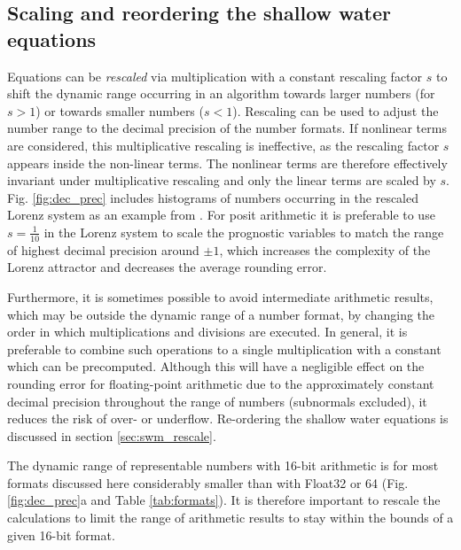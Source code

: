 \subsection{Scaling and reordering the shallow water equations}

Equations can be \emph{rescaled} via multiplication with a constant rescaling
factor $s$ to shift the dynamic range occurring in an algorithm towards larger
numbers (for $s > 1$) or towards smaller numbers ($s < 1$).
Rescaling can be used to adjust the number range to the decimal precision of the
number formats. If nonlinear terms are considered, this multiplicative rescaling
is ineffective, as the rescaling factor $s$ appears inside the non-linear terms.
The nonlinear terms are therefore effectively invariant under multiplicative
rescaling and only the linear terms are scaled by $s$.
Fig. \ref{fig:dec_prec} includes histograms of numbers occurring in the rescaled
Lorenz system \citep{Lorenz1963,Kwasniok2014,Jeffress2017,Tantet2018} as an example
from \cite{Klower2019a}. For posit arithmetic it is preferable to use
$s=\tfrac{1}{10}$ in the Lorenz system to scale the prognostic variables
to match the range of highest decimal precision around $\pm1$, which increases the
complexity of the Lorenz attractor and decreases the average rounding error.

Furthermore, it is sometimes possible to avoid intermediate arithmetic results,
which may be outside the dynamic range of a number format, by changing the order
in which multiplications and divisions are executed. In general, it is preferable
to combine such operations to a single multiplication with a constant which can
be precomputed. Although this will have a negligible effect on the rounding error
for floating-point arithmetic due to the approximately constant decimal precision
throughout the range of numbers (subnormals excluded), it reduces the risk of
over- or underflow. Re-ordering the shallow water equations is discussed in
section \ref{sec:swm_rescale}.

The dynamic range of representable numbers with 16-bit arithmetic is for most
formats discussed here considerably smaller than with Float32 or 64
(Fig. \ref{fig:dec_prec}a and Table \ref{tab:formats}). It is therefore
important to rescale the calculations to limit the range of
arithmetic results to stay within the bounds of a given 16-bit format.

